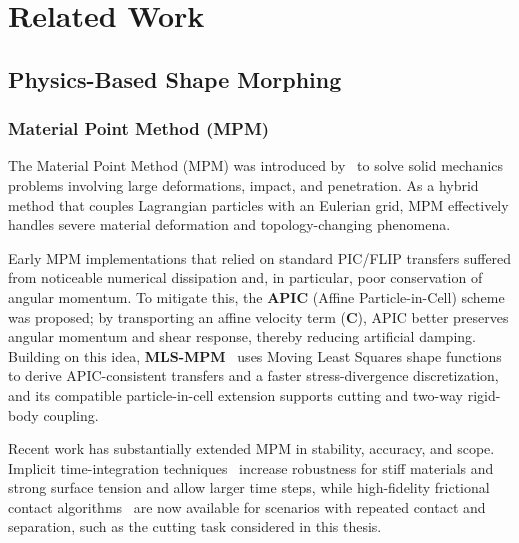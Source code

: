 
\clearpage %

\chapter{Related Work}\label{CH2_RelatedWork}

\section{Physics-Based Shape Morphing}
\subsection{Material Point Method (MPM)}
    The Material Point Method (MPM) was introduced by~\citet{sulsky1994particle} to solve solid mechanics problems involving large deformations, impact, and penetration. As a hybrid method that couples Lagrangian particles with an Eulerian grid, MPM effectively handles severe material deformation and topology-changing phenomena.
    
    Early MPM implementations that relied on standard PIC/FLIP transfers suffered from noticeable numerical dissipation and, in particular, poor conservation of angular momentum. To mitigate this, the \textbf{APIC} (Affine Particle-in-Cell) scheme~\citep{2015-APIC,jiang2017angular} was proposed; by transporting an affine velocity term ($\mathbf{C}$), APIC better preserves angular momentum and shear response, thereby reducing artificial damping. Building on this idea, \textbf{MLS-MPM}~\citep{2018-MLSMPM} uses Moving Least Squares shape functions to derive APIC-consistent transfers and a faster stress-divergence discretization, and its compatible particle-in-cell extension supports cutting and two-way rigid-body coupling.
    
    Recent work has substantially extended MPM in stability, accuracy, and scope. Implicit time-integration techniques~\citep{implicit_mpm_surface_tension, wang2020hierarchical} increase robustness for stiff materials and strong surface tension and allow larger time steps, while high-fidelity frictional contact algorithms~\citep{kakouris2024high} are now available for scenarios with repeated contact and separation, such as the cutting task considered in this thesis.
    
